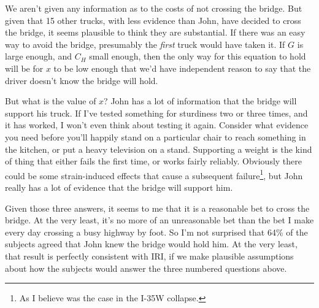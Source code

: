 \documentclass[oneside]{book}
\begin{document}
We aren't given any information as to the costs of not crossing the bridge. But given that 15 other trucks, with less evidence than John, have decided to cross the bridge, it seems plausible to think they are substantial. If there was an easy way to avoid the bridge, presumably the \textit{first} truck would have taken it. If $G$ is large enough, and $C_H$ small enough, then the only way for this equation to hold will be for $x$ to be low enough that we'd have independent reason to say that the driver doesn't know the bridge will hold.

But what is the value of $x$? John has a lot of information that the bridge will support his truck. If I've tested something for sturdiness two or three times, and it has worked, I won't even think about testing it again. Consider what evidence you need before you'll happily stand on a particular chair to reach something in the kitchen, or put a heavy television on a stand. Supporting a weight is the kind of thing that either fails the first time, or works fairly reliably. Obviously there could be some strain-induced effects that cause a subsequent failure\footnote{As I believe was the case in the I-35W collapse.}, but John really has a lot of evidence that the bridge will support him.

Given those three answers, it seems to me that it is a reasonable bet to cross the bridge. At the very least, it's no more of an unreasonable bet than the bet I make every day crossing a busy highway by foot. So I'm not surprised that 64\% of the subjects agreed that John knew the bridge would hold him. At the very least, that result is perfectly consistent with IRI, if we make plausible assumptions about how the subjects would answer the three numbered questions above.
\end{document}
